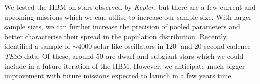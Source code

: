 


We tested the HBM on stars observed by \emph{Kepler}, but there are a few current and upcoming missions which we can utilise to increase our sample size. With larger sample sizes, we can further increase the precision of pooled parameters and better characterise their spread in the population distribution. Recently, \citet{Hatt.Nielsen.ea2023} identified a sample of \(\sim 4000\) solar-like oscillators in 120- and 20-second cadence \emph{TESS} data. Of these, around 50 are dwarf and subgiant stars which we could include in a future iteration of the HBM. However, we anticipate much bigger improvement with future missions expected to launch in a few years time.

